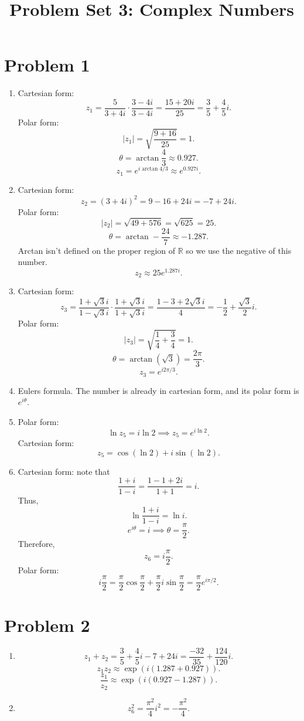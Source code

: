 \documentclass[11pt, letterpaper]{article}
\title{Problem Set 3: Complex Numbers}
\begin{document}
\makeproblem
\section*{Problem 1}
\begin{enumerate}
	\item Cartesian form:
		\[
			z_1=\frac{5}{3+4i} \cdot \frac{3-4i}{3-4i} =\frac{15+20i}{25} =\frac{3}{5} +\frac{4}{5} i
		.\]
		Polar form:
		\[
			\left| z_1 \right| =\sqrt{\frac{9+16}{25} } =1
		.\]
		\[
			\theta =\arctan \frac{4}{3} \approx 0.927
		.\]
		\[
			z_1=e^{i \arctan 4/3} \approx e^{0.927i} 
		.\]
	\item Cartesian form:
		\[
			z_2=\left( 3+4i \right) ^2=9-16+24i=-7+24i
		.\]
		Polar form:
		\[
			\left| z_2 \right| =\sqrt{49+576} =\sqrt{625} = 25
		.\]
		\[
			\theta =\arctan -\frac{24}{7} \approx -1.287
		.\]
		Arctan isn't defined on the proper region of $\mathbb{R} $ so we use the negative of this number.
		\[
			z_2\approx 25e^{1.287i} 
		.\]
	\item Cartesian form:
		\[
			z_3=\frac{1+\sqrt{3} i}{1-\sqrt{3} i} \cdot \frac{1+\sqrt{3} i}{1+\sqrt{3} i} =\frac{1-3+2\sqrt{3} i}{4} =-\frac{1}{2} +\frac{\sqrt{3} }{2} i
		.\]
		Polar form:
		\[
			\left| z_3 \right| =\sqrt{\frac{1}{4} +\frac{3}{4} } =1
		.\]
		\[
			\theta =\arctan (\sqrt{3} )=\frac{2\pi }{3} 
		.\]
		\[
			z_3=e^{i2\pi /3} 
		.\]
	\item Eulers formula. The number is already in cartesian form, and its polar form  is $e^{i\theta } $.
	\item Polar form:
		\[
			\ln z_5=i \ln 2\implies z_5=e^{i \ln 2} 
		.\]
		Cartesian form:
		\[
			z_5=\cos (\ln 2)+i \sin (\ln 2)
		.\]
	\item Cartesian form: note that
		\[
			\frac{1+i}{1-i} =\frac{1-1+2i}{1+1} =i
		.\]
		Thus,
		\[
			\ln \frac{1+i}{1-i} =\ln i
		.\]
		\[
			e^{i\theta } =i \implies \theta =\frac{\pi }{2} 
		.\]
		Therefore,
		\[
			z_6=i\frac{\pi }{2} 
		.\]
		Polar form:
		\[
			i\frac{\pi }{2}=\frac{\pi }{2} \cos \frac{\pi }{2} +\frac{\pi }{2} i \sin \frac{\pi }{2}  =\frac{\pi }{2} e^{i\pi /2} 
		.\]
\end{enumerate}
\section*{Problem 2}
\begin{enumerate}
	\item
		\[
			z_1+z_2=\frac{3}{5} +\frac{4}{5} i-7+24i=\frac{-32}{35} +\frac{124}{120} i
		.\]
		\[
			z_1z_2\approx \exp \left( i\left( 1.287+0.927 \right)  \right) 
		.\]
		\[
			\frac{z_1}{z_2} \approx \exp \left( i\left( 0.927-1.287 \right)  \right) 
		.\]
	\item 
		\[
			z_6^2=\frac{\pi ^2}{4} i^2=-\frac{\pi ^2}{4} 
		.\]
\end{enumerate}
\end{document}
